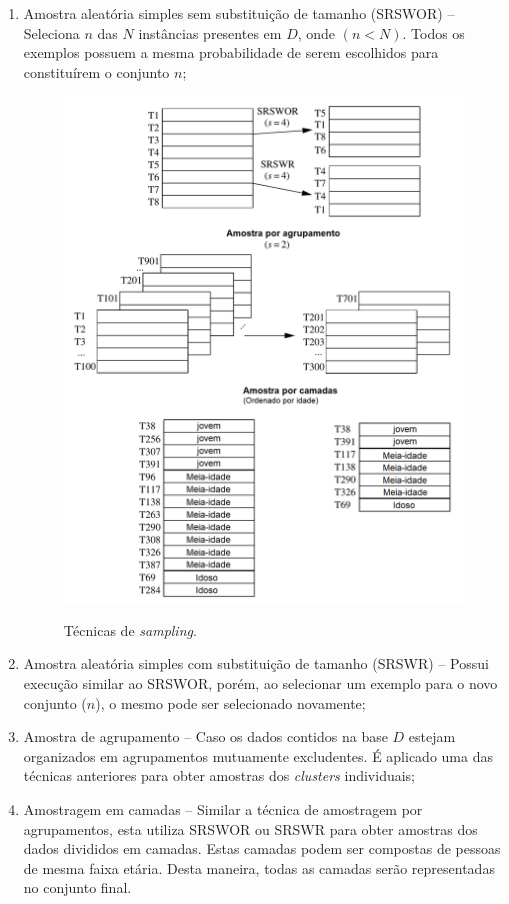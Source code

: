 \begin{enumerate}[label=\roman*.]
    \item Amostra aleatória simples sem substituição de tamanho (SRSWOR) {--} Seleciona $n$ das $N$ instâncias presentes em $D$, onde $\left ( n < N \right )$. Todos os exemplos possuem a mesma probabilidade de serem escolhidos para constituírem o conjunto $n$;
    
    \begin{figure}[H]
        \centering
        \caption{Técnicas de \textit{sampling}.}
        \includegraphics[width=0.65\linewidth]{figuras/sampling.png}
        \label{fig:sampling}
    \end{figure}
    
    \item Amostra aleatória simples com substituição de tamanho (SRSWR) {--} Possui execução similar ao SRSWOR, porém, ao selecionar um exemplo para o novo conjunto ($n$), o mesmo pode ser selecionado novamente;
    \item Amostra de agrupamento {--} Caso os dados contidos na base $D$ estejam organizados em agrupamentos mutuamente excludentes. É aplicado uma das técnicas anteriores para obter amostras dos \textit{clusters} individuais;
    \item Amostragem em camadas {--} Similar a técnica de amostragem por agrupamentos, esta utiliza SRSWOR ou SRSWR para obter amostras dos dados divididos em camadas. Estas camadas podem ser compostas de pessoas de mesma faixa etária. Desta maneira, todas as camadas serão representadas no conjunto final.
\end{enumerate}

